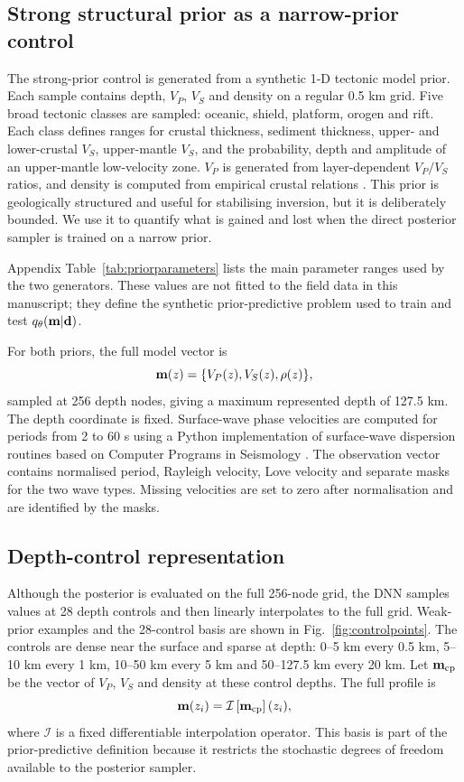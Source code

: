 \documentclass[referee]{gji}
\begin{document}
\subsection{Strong structural prior as a narrow-prior control}

The strong-prior control is generated from a synthetic 1-D tectonic model prior. Each sample contains depth, $V_P$, $V_S$ and density on a regular 0.5 km grid. Five broad tectonic classes are sampled: oceanic, shield, platform, orogen and rift. Each class defines ranges for crustal thickness, sediment thickness, upper- and lower-crustal $V_S$, upper-mantle $V_S$, and the probability, depth and amplitude of an upper-mantle low-velocity zone. $V_P$ is generated from layer-dependent $V_P/V_S$ ratios, and density is computed from empirical crustal relations \citep{Brocher2005}. This prior is geologically structured and useful for stabilising inversion, but it is deliberately bounded. We use it to quantify what is gained and lost when the direct posterior sampler is trained on a narrow prior.

Appendix Table~\ref{tab:priorparameters} lists the main parameter ranges used by the two generators. These values are not fitted to the field data in this manuscript; they define the synthetic prior-predictive problem used to train and test $q_\theta({\bf m}|{\bf d})$.

For both priors, the full model vector is
\begin{equation}
{\bf m}(z)=\{V_P(z),V_S(z),\rho(z)\},
\end{equation}
sampled at 256 depth nodes, giving a maximum represented depth of 127.5 km. The depth coordinate is fixed. Surface-wave phase velocities are computed for periods from 2 to 60 s using a Python implementation of surface-wave dispersion routines based on Computer Programs in Seismology \citep{Herrmann2013,LuuDisba}. The observation vector contains normalised period, Rayleigh velocity, Love velocity and separate masks for the two wave types. Missing velocities are set to zero after normalisation and are identified by the masks.

\subsection{Depth-control representation}

Although the posterior is evaluated on the full 256-node grid, the DNN samples values at 28 depth controls and then linearly interpolates to the full grid. Weak-prior examples and the 28-control basis are shown in Fig.~\ref{fig:controlpoints}. The controls are dense near the surface and sparse at depth: 0--5 km every 0.5 km, 5--10 km every 1 km, 10--50 km every 5 km and 50--127.5 km every 20 km. Let ${\bf m}_{\rm cp}$ be the vector of $V_P$, $V_S$ and density at these control depths. The full profile is
\begin{equation}
{\bf m}(z_i)=\mathcal{I}\left[{\bf m}_{\rm cp}\right](z_i),
\end{equation}
where $\mathcal{I}$ is a fixed differentiable interpolation operator. This basis is part of the prior-predictive definition because it restricts the stochastic degrees of freedom available to the posterior sampler.
\end{document}

